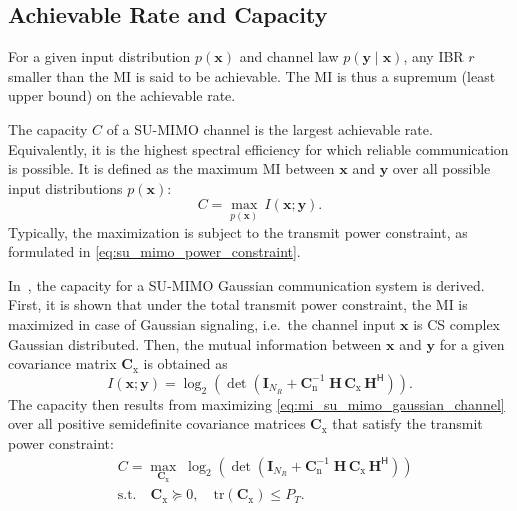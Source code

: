 \subsection{Achievable Rate and Capacity}
\label{subsection:achievable_rate_and_capacity}

For a given input distribution $p(\mathbf{x})$ and channel law $p(\mathbf{y}\mid\mathbf{x})$, any \ac{IBR} $r$ smaller than the \ac{MI} is said to be achievable. The \ac{MI} is thus a supremum (least upper bound) on the achievable rate.

The capacity $C$ of a \ac{SU}-\ac{MIMO} channel is the largest achievable rate. Equivalently, it is the highest spectral efficiency for which reliable communication is possible. It is defined as the maximum \ac{MI} between $\mathbf{x}$ and $\mathbf{y}$ over all possible input distributions $p(\mathbf{x})$:
\begin{equation}
\label{eq:capacity}
    C = \max_{p(\mathbf{x})} \, I(\mathbf{x};\mathbf{y}).
\end{equation}
Typically, the maximization is subject to the transmit power constraint, as formulated in \eqref{eq:su_mimo_power_constraint}.

In~\cite{telatar_1999}, the capacity for a \ac{SU}-\ac{MIMO} Gaussian communication system is derived. First, it is shown that under the total transmit power constraint, the \ac{MI} is maximized in case of Gaussian signaling, i.e.\ the channel input $\mathbf{x}$ is \ac{CS} complex Gaussian distributed. Then, the mutual information between $\mathbf{x}$ and $\mathbf{y}$ for a given covariance matrix $\mathbf{C}_{\mathrm{x}}$ is obtained as
\begin{equation}
\label{eq:mi_su_mimo_gaussian_channel}
    I(\mathbf{x};\mathbf{y})
    = \log_2\left(\det\left(\mathbf{I}_{N_R} +  \mathbf{C}_{\mathrm{n}}^{-1} \; \mathbf{H}\,\mathbf{C}_{\mathrm{x}}\,\mathbf{H}^\mathsf{H} \right)\right).
\end{equation}
The capacity then results from maximizing \eqref{eq:mi_su_mimo_gaussian_channel} over all positive semidefinite covariance matrices $\mathbf{C}_{\mathrm{x}}$ that satisfy the transmit power constraint:
\begin{equation}
\label{eq:capacity_su_mimo_gaussian_channel_optimization_problem}
\begin{aligned}
    & C = \max_{\mathbf{C}_{\mathrm{x}}} \; \log_2\left(\det\left(\mathbf{I}_{N_R} + \mathbf{C}_{\mathrm{n}}^{-1} \; \mathbf{H}\,\mathbf{C}_{\mathrm{x}}\,\mathbf{H}^\mathsf{H} \right)\right) \\
    & \text{s.t.} \quad \mathbf{C}_{\mathrm{x}} \succeq 0, \quad \mathrm{tr}\!\left(\mathbf{C}_{\mathrm{x}}\right) \leq P_T.
\end{aligned}
\end{equation}

